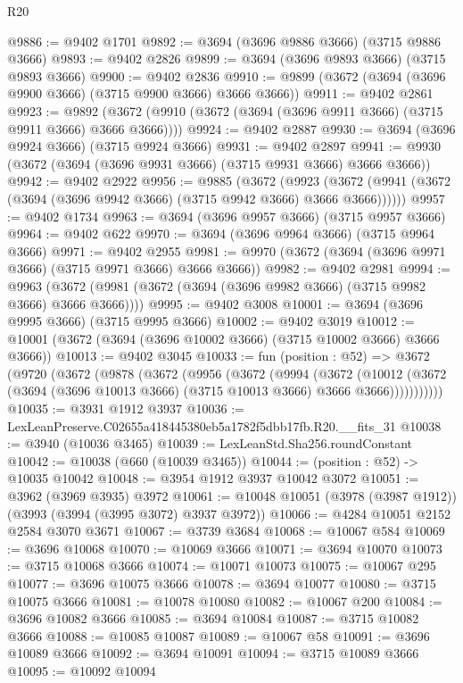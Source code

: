 \begin{lexlean}{R20}
\begin{coremodule}
@9886 := @9402 @1701
@9892 := @3694 (@3696 @9886 @3666) (@3715 @9886 @3666)
@9893 := @9402 @2826
@9899 := @3694 (@3696 @9893 @3666) (@3715 @9893 @3666)
@9900 := @9402 @2836
@9910 := @9899 (@3672 (@3694 (@3696 @9900 @3666) (@3715 @9900 @3666) @3666 @3666))
@9911 := @9402 @2861
@9923 := @9892 (@3672 (@9910 (@3672 (@3694 (@3696 @9911 @3666) (@3715 @9911 @3666) @3666 @3666))))
@9924 := @9402 @2887
@9930 := @3694 (@3696 @9924 @3666) (@3715 @9924 @3666)
@9931 := @9402 @2897
@9941 := @9930 (@3672 (@3694 (@3696 @9931 @3666) (@3715 @9931 @3666) @3666 @3666))
@9942 := @9402 @2922
@9956 := @9885
    (@3672
      (@9923 (@3672 (@9941 (@3672 (@3694 (@3696 @9942 @3666) (@3715 @9942 @3666) @3666 @3666))))))
@9957 := @9402 @1734
@9963 := @3694 (@3696 @9957 @3666) (@3715 @9957 @3666)
@9964 := @9402 @622
@9970 := @3694 (@3696 @9964 @3666) (@3715 @9964 @3666)
@9971 := @9402 @2955
@9981 := @9970 (@3672 (@3694 (@3696 @9971 @3666) (@3715 @9971 @3666) @3666 @3666))
@9982 := @9402 @2981
@9994 := @9963 (@3672 (@9981 (@3672 (@3694 (@3696 @9982 @3666) (@3715 @9982 @3666) @3666 @3666))))
@9995 := @9402 @3008
@10001 := @3694 (@3696 @9995 @3666) (@3715 @9995 @3666)
@10002 := @9402 @3019
@10012 := @10001 (@3672 (@3694 (@3696 @10002 @3666) (@3715 @10002 @3666) @3666 @3666))
@10013 := @9402 @3045
@10033 := fun (position : @52) =>
  @3672
    (@9720
      (@3672
        (@9878
          (@3672
            (@9956
              (@3672
                (@9994
                  (@3672
                    (@10012
                      (@3672 (@3694 (@3696 @10013 @3666) (@3715 @10013 @3666) @3666 @3666)))))))))))
@10035 := @3931 @1912 @3937
@10036 := LexLeanPreserve.C02655a418445380eb5a1782f5dbb17fb.R20.__fits_31
@10038 := @3940 (@10036 @3465)
@10039 := LexLeanStd.Sha256.roundConstant
@10042 := @10038 (@660 (@10039 @3465))
@10044 := (position : @52) -> @10035 @10042
@10048 := @3954 @1912 @3937 @10042 @3072
@10051 := @3962 (@3969 @3935) @3972
@10061 := @10048 @10051 (@3978 (@3987 @1912)) (@3993 (@3994 (@3995 @3072) @3937 @3972))
@10066 := @4284 @10051 @2152 @2584 @3070 @3671
@10067 := @3739 @3684
@10068 := @10067 @584
@10069 := @3696 @10068
@10070 := @10069 @3666
@10071 := @3694 @10070
@10073 := @3715 @10068 @3666
@10074 := @10071 @10073
@10075 := @10067 @295
@10077 := @3696 @10075 @3666
@10078 := @3694 @10077
@10080 := @3715 @10075 @3666
@10081 := @10078 @10080
@10082 := @10067 @200
@10084 := @3696 @10082 @3666
@10085 := @3694 @10084
@10087 := @3715 @10082 @3666
@10088 := @10085 @10087
@10089 := @10067 @58
@10091 := @3696 @10089 @3666
@10092 := @3694 @10091
@10094 := @3715 @10089 @3666
@10095 := @10092 @10094

\end{coremodule}
\end{lexlean}
